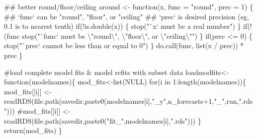 \documentclass[
  11pt,
]{article}
\newenvironment{Shaded}{}{}
\newcommand{\CharTok}[1]{\textcolor[rgb]{0.00,0.50,0.50}{#1}}
\newcommand{\CommentTok}[1]{\textcolor[rgb]{0.00,0.50,0.00}{#1}}
\newcommand{\ControlFlowTok}[1]{\textcolor[rgb]{0.00,0.00,1.00}{#1}}
\newcommand{\DataTypeTok}[1]{#1}
\newcommand{\DecValTok}[1]{#1}
\newcommand{\KeywordTok}[1]{\textcolor[rgb]{0.00,0.00,1.00}{#1}}
\newcommand{\NormalTok}[1]{#1}
\newcommand{\OperatorTok}[1]{#1}
\newcommand{\OtherTok}[1]{\textcolor[rgb]{1.00,0.25,0.00}{#1}}
\newcommand{\StringTok}[1]{\textcolor[rgb]{0.00,0.50,0.50}{#1}}
\begin{document}
\begin{Shaded}
\begin{Highlighting}[]
\CommentTok{## better round/floor/ceiling}
\NormalTok{around <-}\StringTok{ }\ControlFlowTok{function}\NormalTok{(x, }\DataTypeTok{func =} \StringTok{"round"}\NormalTok{, }\DataTypeTok{prec =} \DecValTok{1}\NormalTok{) \{}
  \CommentTok{## `func` can be "round", "floor", or "ceiling"}
  \CommentTok{## `prec` is desired precision (eg, 0.1 is to nearest tenth)}
  \ControlFlowTok{if}\NormalTok{(}\OperatorTok{!}\KeywordTok{is.double}\NormalTok{(x)) \{}
    \KeywordTok{stop}\NormalTok{(}\StringTok{"`x` must be a real number"}\NormalTok{)}
\NormalTok{  \}}
  \ControlFlowTok{if}\NormalTok{(}\OperatorTok{!}\NormalTok{(func }\OperatorTok{%
    \KeywordTok{stop}\NormalTok{(}\StringTok{"`func` must be }\CharTok{\textbackslash{}"}\StringTok{round}\CharTok{\textbackslash{}"}\StringTok{, }\CharTok{\textbackslash{}"}\StringTok{floor}\CharTok{\textbackslash{}"}\StringTok{, or }\CharTok{\textbackslash{}"}\StringTok{ceiling}\CharTok{\textbackslash{}"}\StringTok{"}\NormalTok{)}
\NormalTok{  \}}
  \ControlFlowTok{if}\NormalTok{(prec }\OperatorTok{<=}\StringTok{ }\DecValTok{0}\NormalTok{) \{}
    \KeywordTok{stop}\NormalTok{(}\StringTok{"`prec` cannot be less than or equal to 0"}\NormalTok{)}
\NormalTok{  \}}
  \KeywordTok{do.call}\NormalTok{(func, }\KeywordTok{list}\NormalTok{(x }\OperatorTok{/}\StringTok{ }\NormalTok{prec)) }\OperatorTok{*}\StringTok{ }\NormalTok{prec}
\NormalTok{\}}

\CommentTok{#load complete model fits & model refits with subset data}
\NormalTok{loadmodfits<-}\ControlFlowTok{function}\NormalTok{(modelnames)\{}
\NormalTok{  mod_fits<-}\KeywordTok{list}\NormalTok{(}\OtherTok{NULL}\NormalTok{)}
  \ControlFlowTok{for}\NormalTok{(i }\ControlFlowTok{in} \DecValTok{1}\OperatorTok{:}\KeywordTok{length}\NormalTok{(modelnames))\{}
\NormalTok{    mod_fits[[i]] <-}\StringTok{ }\KeywordTok{readRDS}\NormalTok{(}\KeywordTok{file.path}\NormalTok{(savedir,}\KeywordTok{paste0}\NormalTok{(modelnames[i],}\StringTok{"_y"}\NormalTok{,n_forecasts}\OperatorTok{+}\DecValTok{1}\NormalTok{,}\StringTok{"_"}\NormalTok{,run,}\StringTok{".rds"}\NormalTok{)))}
    \CommentTok{#mod_fits[[i]] <- readRDS(file.path(savedir,paste0("fit_",modelnames[i],".rds")))}
\NormalTok{  \}}
  \KeywordTok{return}\NormalTok{(mod_fits)}
\NormalTok{\}}

}
\end{Highlighting}
\end{Shaded}
\end{document}
